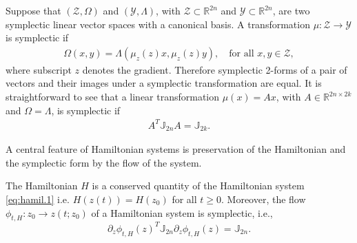 Suppose that $(\mathcal Z,\Omega)$ and $(\mathcal Y,\Lambda)$, with $\mathcal Z \subset \mathbb R^{2n}$ and $\mathcal Y \subset \mathbb R^{2n}$, are two symplectic linear vector spaces with a canonical basis. A transformation $\mu:\mathcal Z\to\mathcal Y$ is symplectic if
\begin{eqnarray} \label{eq:hamil.3}
	\Omega(x,y) = \Lambda(\mu_z(z)x,\mu_z(z)y), \quad \text{for all } x,y\in\mathcal Z,
\end{eqnarray}
where subscript $z$ denotes the gradient. Therefore symplectic 2-forms of a pair of vectors and their images under a symplectic transformation are equal. It is straightforward to see that a linear transformation $\mu(x) = Ax$, with $A\in \mathbb R^{2n\times 2k}$ and $\Omega = \Lambda$, is symplectic if
\begin{eqnarray} \label{eq:hamil.4}
	A^T \mathbb J_{2n} A = \mathbb J_{2k}.
\end{eqnarray}


A central feature of Hamiltonian systems is preservation of the Hamiltonian and the symplectic form by the flow of the system.
\begin{theorem} \label{thm:1}
\cite{Marsden:2010:IMS:1965128} The Hamiltonian $H$ is a conserved quantity of the Hamiltonian system \eqref{eq:hamil.1} i.e. $H(z(t)) = H(z_0)$ for all $t \geq 0$. Moreover, the flow $\phi_{t,H}:z_0 \to z(t;z_0)$ of a Hamiltonian system is symplectic, i.e.,
$$\partial_z \phi_{t,H}(z)^T \mathbb J_{2n} \partial_z \phi_{t,H}(z) = \mathbb J_{2n}.$$
\end{theorem}

